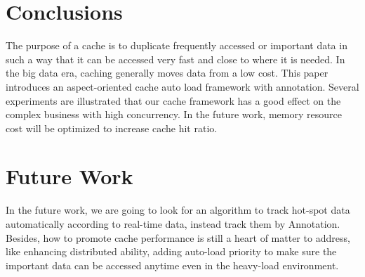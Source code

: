 \documentclass{singlecol-new}
\theoremstyle{TH}{
\newtheorem{lemma}{Lemma}
\newtheorem{theorem}[lemma]{Theorem}
\newtheorem{corrolary}[lemma]{Corrolary}
\newtheorem{conjecture}[lemma]{Conjecture}
\newtheorem{proposition}[lemma]{Proposition}
\newtheorem{claim}[lemma]{Claim}
\newtheorem{stheorem}[lemma]{Wrong Theorem}
}
\theoremstyle{THrm}{
\newtheorem{definition}{Definition}[section]
\newtheorem{question}{Question}[section]
\newtheorem{remark}{Remark}
\newtheorem{scheme}{Scheme}
}
\theoremstyle{THhit}{
\newtheorem{case}{Case}[section]
}
\begin{document}
\section{Conclusions}
\label{Conclusions}

The purpose of a cache is to duplicate frequently accessed or important data in such a way that it can be accessed very fast and close to where it is needed. In the big data era, caching generally moves data from a low cost. This paper introduces an aspect-oriented cache auto load framework with annotation. Several experiments are illustrated that our cache framework has a good effect on the complex business with high concurrency. In the future work, memory resource cost will be optimized to increase cache hit ratio.

\section{Future Work}
\label{futurework}

In the future work, we are going to look for an algorithm to track hot-spot data automatically according to real-time data, instead track them by Annotation. Besides, how to promote cache performance is still a heart of matter to address, like enhancing distributed ability, adding auto-load priority to make sure the important data can be accessed anytime even in the heavy-load environment.





%
%
%



\end{document}
